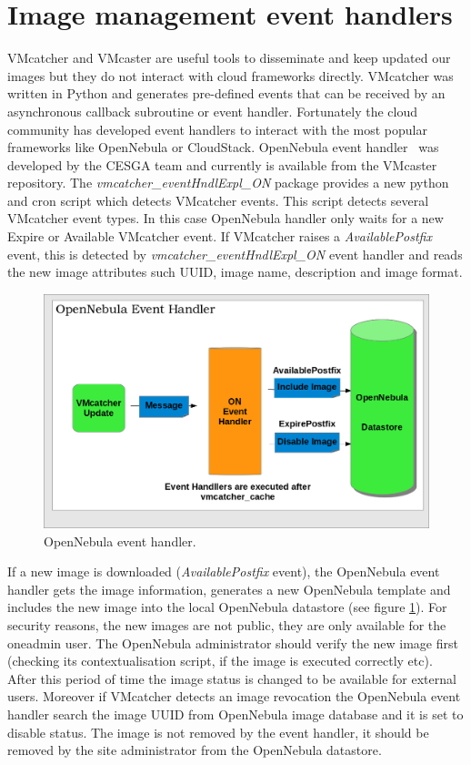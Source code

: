 \documentclass{llncs_Ibergrid2013}
\begin{document}
\section{Image management event handlers}
\label{sect-handlers}
VMcatcher and VMcaster are useful tools to disseminate and keep updated our images but they do not interact with cloud frameworks directly.
VMcatcher was written in Python and generates pre-defined events that can be received by an asynchronous callback subroutine or event handler.
Fortunately the cloud community has developed event handlers to interact with the most popular frameworks like OpenNebula or CloudStack.
OpenNebula event handler~\cite{onevent} was developed by the CESGA team and currently is available from the VMcaster repository. 
The \textit{vmcatcher\_eventHndlExpl\_ON} package provides a new python and cron script which detects VMcatcher events. 
This script detects several VMcatcher event types. In this case OpenNebula handler only waits for a new Expire or Available VMcatcher event.
If VMcatcher raises a \textit{AvailablePostfix} event, this is detected by \textit{vmcatcher\_eventHndlExpl\_ON} event handler and reads the new image attributes such UUID, image name, description and image format.
\begin{figure}[h]
\centering
\includegraphics[width=1\textwidth]{ONeventhandler.png}
\caption{OpenNebula event handler.}
\label{fig:onevent}
\end{figure}
If a new image is downloaded (\textit{AvailablePostfix} event), the OpenNebula event handler gets the image information, generates a new OpenNebula template and includes the new image into the local OpenNebula datastore (see figure \ref{fig:onevent}). 
For security reasons, the new images are not public, they are only available for the oneadmin user. The OpenNebula administrator should verify the new image first (checking its contextualisation script, if the image is executed correctly etc).
After this period of time the image status is changed to be available for external users. 
Moreover if VMcatcher detects an image revocation the OpenNebula event handler search the image UUID from OpenNebula image database and it is set to disable status.
The image is not removed by the event handler, it should be removed by the site administrator from the OpenNebula datastore.
\end{document}
